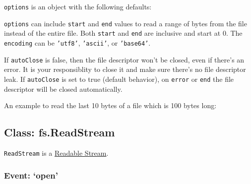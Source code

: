 \texttt{options} is an object with the following defaults:

\begin{Shaded}
\begin{Highlighting}[]
\NormalTok{\{ }\NormalTok{: }\NormalTok{,}
  \NormalTok{: }\NormalTok{,}
  \NormalTok{: } \NormalTok{* }\NormalTok{,}
  \NormalTok{: }
\NormalTok{\}}
\end{Highlighting}
\end{Shaded}

\texttt{options} can include \texttt{start} and \texttt{end} values to
read a range of bytes from the file instead of the entire file. Both
\texttt{start} and \texttt{end} are inclusive and start at 0. The
\texttt{encoding} can be \texttt{'utf8'}, \texttt{'ascii'}, or
\texttt{'base64'}.

If \texttt{autoClose} is false, then the file descriptor won't be
closed, even if there's an error. It is your responsiblity to close it
and make sure there's no file descriptor leak. If \texttt{autoClose} is
set to true (default behavior), on \texttt{error} or \texttt{end} the
file descriptor will be closed automatically.

An example to read the last 10 bytes of a file which is 100 bytes long:

\begin{Shaded}
\begin{Highlighting}[]
\NormalTok{(}\NormalTok{, \{}\NormalTok{: }\NormalTok{, }\NormalTok{: }\NormalTok{\});}
\end{Highlighting}
\end{Shaded}

\subsection{Class: fs.ReadStream}

\texttt{ReadStream} is a
\href{stream.html\#stream\_readable\_stream}{Readable Stream}.

\subsubsection{Event: `open'}

